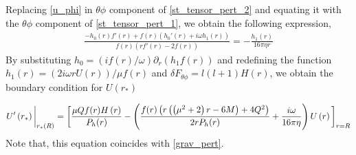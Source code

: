 \documentclass[aps,prd,twocolumn,floatfix,noshowpacs,tightenlines,noshowkeys,superscriptaddress,amsmath,amssymb,
nofootinbib]{revtex4-1}
\renewcommand\[{\begin{equation}}
\renewcommand\]{\end{equation}}
\begin{document}
Replacing \autoref{u_phi} in $\theta\phi$ component of \autoref{st_tensor_pert_2} and equating it with the $\theta\phi$ component of \autoref{st_tensor_pert_1}, we obtain the following expression,
\begin{equation}\label{bc_prepre}
	\begin{aligned}
\frac{-h_0(r) f'(r)+f(r) \left(h_0'(r)+i \omega  h_1(r)\right)}{f(r) \left(r f'(r)-2 f(r)\right)}=-\frac{h_1(r)}{16 \pi  \eta  r }
	\end{aligned}
\end{equation}
By substituting $h_0=(if(r)/\omega)\partial_r(h_1 f(r))$ and redefining the function $h_1(r)=(2 i \omega r U(r))/\mu f(r)$ and $\delta F_{\theta\phi}=l(l+1) H(r) $, we obtain the boundary condition for $U(r_*)$
\begin{widetext}
	\begin{equation}
		U'\left(r_*\right)\bigg{|}_{r_*(R)}=\bigg[\frac{\mu  Q f(r) H\left(r\right)}{P_h(r)}-\left(\frac{f(r) \left(r \left(\left(\mu ^2+2\right) r-6 M\right)+4 Q^2\right)}{2 r P_h(r)}+\frac{i \omega }{16 \pi  \eta }\right)U\left(r\right)\bigg]_{r=R}
	\end{equation}
	Note that, this equation coincides with \autoref{grav_pert}.
\end{widetext}



\end{document}

